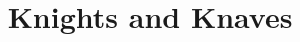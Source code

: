 \documentclass[professionalfonts]{beamer}
\title{Knights and Knaves}
\begin{document}
\newcommand{\hL}{\rule{0.6\textwidth}{0.4pt}}
\frame{\titlepage}

\end{document}
